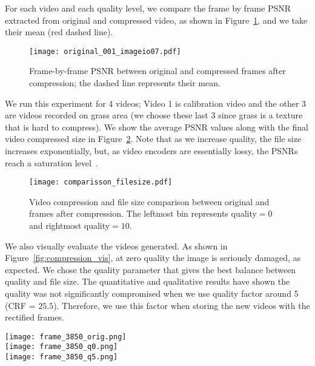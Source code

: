 For each video and each quality level, we compare the frame by frame PSNR extracted from original and compressed video, as shown in Figure~\ref{fig:vid_psnr}, and we take their mean (red dashed line).
%
\begin{figure}[htb]
	\centering
	\texttt{[image: original\_001\_imageio07.pdf]}
	\caption[Frame-by-frame PSNR between original and compressed frames after compression.]
	{Frame-by-frame PSNR between original and compressed frames after compression; the dashed line represents their mean.}
	\label{fig:vid_psnr}
\end{figure}
%
We run this experiment for 4 videos; Video 1 is calibration video and the other 3 are videos recorded on grass area (we choose these last 3 since grass is a texture that is hard to compress).
We show the average PSNR values along with the final video compressed size in Figure~\ref{fig:compression_comp}.
Note that as we increase quality, the file size increases exponentially,
but, as video encoders are essentially lossy, the PSNRs reach a saturation level~\cite{web:ffmpeg}.
%
%
\begin{figure}[hbt!]
	\centering
	\texttt{[image: comparisson\_filesize.pdf]}
	\caption[Video compression and file size comparison]{Video compression and file size comparison between original and frames after compression.
	The leftmost bin represents quality$=0$ and rightmost quality$=10$.}
	\label{fig:compression_comp}
\end{figure}
%

We also visually evaluate the videos generated.
As shown in Figure~\ref{fig:compression_vis}, at zero quality the image is seriously damaged, as expected.
We chose the quality parameter that gives the best balance between quality and file size.
The quantitative and qualitative results have shown the quality was not significantly compromised when we use quality factor around 5 (CRF = $25.5$).
Therefore, we use this factor when storing the new videos with the rectified frames.

\begin{figure*}[htb!]
	\centering
	\texttt{[image: frame\_3850\_orig.png]}\\
	\vspace{2mm}
	\texttt{[image: frame\_3850\_q0.png]}\\
	\vspace{2mm}
	\texttt{[image: frame\_3850\_q5.png]}
	\caption[Compression quality comparison]{Compression quality comparison. From up to down: frame from original video, quality = 0, and quality = 5.}
	\label{fig:compression_vis}
\end{figure*}

